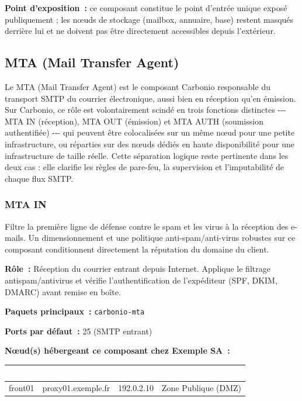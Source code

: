 \documentclass[11pt,a4paper]{report}
\newcommand{\tblhead}[1]{\textcolor{white}{\textbf{#1}}}
\begin{document}
\textbf{Point d'exposition~:} ce composant constitue le point d'entrée unique exposé publiquement ; les nœuds de stockage (mailbox, annuaire, base) restent masqués derrière lui et ne doivent pas être directement accessibles depuis l'extérieur.



\subsection{MTA (Mail Transfer Agent)}
Le MTA (Mail Transfer Agent) est le composant Carbonio responsable du transport SMTP du courrier électronique, aussi bien en réception qu'en émission.\allowbreak{} Sur Carbonio, ce rôle est volontairement scindé en trois fonctions distinctes -\allowbreak{}-\allowbreak{}-\allowbreak{} MTA IN (réception), MTA OUT (émission) et MTA AUTH (soumission authentifiée) -\allowbreak{}-\allowbreak{}-\allowbreak{} qui peuvent être colocalisées sur un même nœud pour une petite infrastructure, ou réparties sur des nœuds dédiés en haute disponibilité pour une infrastructure de taille réelle.\allowbreak{} Cette séparation logique reste pertinente dans les deux cas : elle clarifie les règles de pare-\allowbreak{}feu, la supervision et l'imputabilité de chaque flux SMTP.\allowbreak{}

\subsubsection{MTA IN}

Filtre la première ligne de défense contre le spam et les virus à la réception des e-\allowbreak{}mails.\allowbreak{} Un dimensionnement et une politique anti-\allowbreak{}spam/anti-\allowbreak{}virus robustes sur ce composant conditionnent directement la réputation du domaine du client.\allowbreak{}

\textbf{Rôle~:} Réception du courrier entrant depuis Internet.\allowbreak{} Applique le filtrage antispam/antivirus et vérifie l'authentification de l'expéditeur (SPF, DKIM, DMARC) avant remise en boîte.\allowbreak{}


\textbf{Paquets principaux~:} \texttt{carbonio-\allowbreak{}mta}

\textbf{Ports par défaut~:} 25 (SMTP entrant)

\textbf{Nœud(s) hébergeant ce composant chez Exemple SA~:}
\begin{longtable}{|p{3.2cm}|p{4.5cm}|p{3.2cm}|p{2.3cm}|}
\hline
\rowcolor{primary}\tblhead{Nœud} & \tblhead{Hostname} & \tblhead{IP} & \tblhead{Zone} \\
\hline
\endhead
front01 & proxy01.\allowbreak{}exemple.\allowbreak{}fr & 192.\allowbreak{}0.\allowbreak{}2.\allowbreak{}10 & Zone Publique (DMZ) \\
\hline
\end{longtable}
\end{document}
